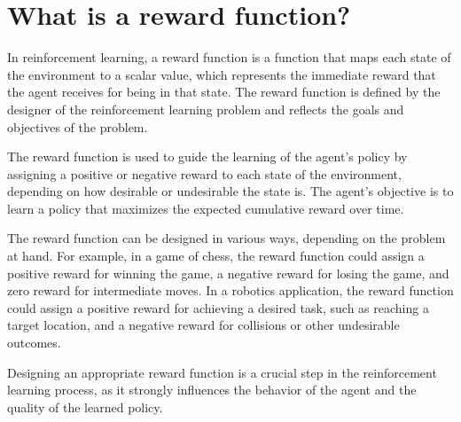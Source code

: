 \section{What is a reward function?}
In reinforcement learning, a reward function is a function that maps each state of the environment to a scalar value, which represents the immediate reward that the agent receives for being in that state. The reward function is defined by the designer of the reinforcement learning problem and reflects the goals and objectives of the problem.

The reward function is used to guide the learning of the agent's policy by assigning a positive or negative reward to each state of the environment, depending on how desirable or undesirable the state is. The agent's objective is to learn a policy that maximizes the expected cumulative reward over time.

The reward function can be designed in various ways, depending on the problem at hand. For example, in a game of chess, the reward function could assign a positive reward for winning the game, a negative reward for losing the game, and zero reward for intermediate moves. In a robotics application, the reward function could assign a positive reward for achieving a desired task, such as reaching a target location, and a negative reward for collisions or other undesirable outcomes.

Designing an appropriate reward function is a crucial step in the reinforcement learning process, as it strongly influences the behavior of the agent and the quality of the learned policy.

